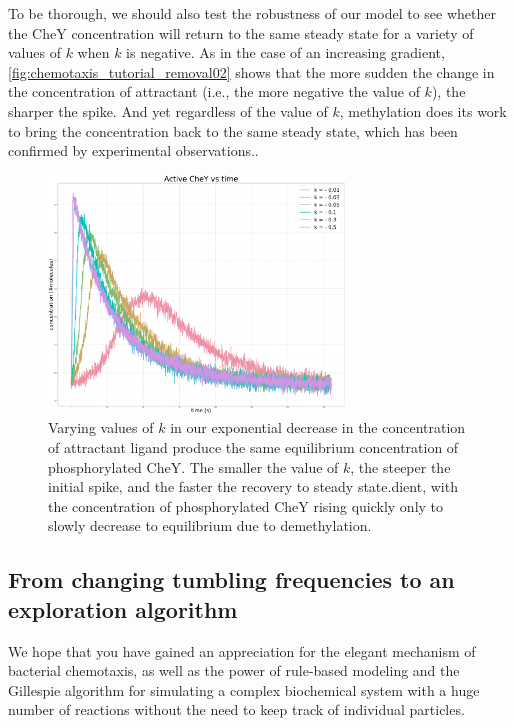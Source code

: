To be thorough, we should also test the robustness of our model to see whether the CheY concentration will return to the same steady state for a variety of values of $k$ when $k$ is negative. As in the case of an increasing gradient, \autoref{fig:chemotaxis_tutorial_removal02} shows that the more sudden the change in the concentration of attractant (i.e., the more negative the value of $k$), the sharper the spike. And yet regardless of the value of $k$, methylation does its work to bring the concentration back to the same steady state, which has been confirmed by experimental observations.\citep{Krembel_2015}.

\begin{figure}[h]
\centering
\mySfFamily
\includegraphics[width = 0.7\textwidth]{../images/chemotaxis_tutorial_removal02.png}
\caption{Varying values of $k$ in our exponential decrease in the concentration of attractant ligand produce the same equilibrium concentration of phosphorylated CheY. The smaller the value of $k$, the steeper the initial spike, and the faster the recovery to steady state.dient, with the concentration of phosphorylated CheY rising quickly only to slowly decrease to equilibrium due to demethylation.}
\label{fig:chemotaxis_tutorial_removal02}
\end{figure}

\FloatBarrier
{}
\subsection{From changing tumbling frequencies to an exploration algorithm}

We hope that you have gained an appreciation for the elegant mechanism of bacterial chemotaxis, as well as the power of rule-based modeling and the Gillespie algorithm for simulating a complex biochemical system with a huge number of reactions without the need to keep track of individual particles.

